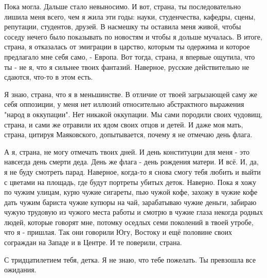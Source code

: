 Пока могла. Дальше стало невыносимо. И вот, страна, ты последовательно лишила
меня всего, чем я жила эти годы: науки, студенчества, кафедры, сцены,
репутации, студентов, друзей. В насмешку ты оставила меня живой, чтобы соседу
нечего было показывать по новостям и чтобы я дольше мучалась. В итоге, страна,
я отказалась от эмиграции в царство, которым ты одержима и которое предлагало
мне себя само, - Европа. Вот тогда, страна, я впервые ощутила, что ты - не я,
что я сильнее твоих фантазий. Наверное, русские действительно не сдаются,
что-то в этом есть.

Я знаю, страна, что я в меньшинстве. В отличие от твоей загрызающей саму же
себя оппозиции, у меня нет иллюзий относительно абстрактного выражения "народ в
оккупации". Нет никакой оккупации. Мы сами породили своих чудовищ, страна, и
сами же отравили их ядом своих отцов и детей. И даже моя мать, страна, цитируя
Маяковского, допытывается, почему я не отмечаю день флага.

А я, страна, не могу отмечать твоих дней. И день конституции для меня - это
навсегда день смерти деда. День же флага - день рождения матери. И всё. И, да,
я не буду смотреть парад. Наверное, когда-то я снова смогу тебя любить и выйти
с цветами на площадь, где будут портреты убитых деток. Наверно. Пока я хожу по
чужим улицам, курю чужие сигареты, пью чужой кофе, захожу в чужие кофе дать
чужим бариста чужие купюры на чай, зарабатываю чужие деньги, забираю чужую
трудовую из чужого места работы и смотрю в чужие глаза некогда родных людей,
которые говорят мне, потомку оседлых семи поколений в твоей утробе, что я -
пришлая. Так они говорили Югу, Востоку и ещё половине своих сограждан на Западе
и в Центре. И те поверили, страна.

С тридцатилетием тебя, детка. Я не знаю, что тебе пожелать. Ты превзошла все
ожидания.

